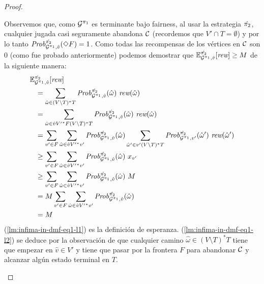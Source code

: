 \begin{proof}
\begin{proofofclaim}
    Observemos que, como $\mathcal{G}^{\pi_{1}}$ es terminante bajo fairness,
    al usar la estrategia $\hat{\pi_{2}}$, cualquier jugada casi seguramente abandona $\mathcal{C}$ (recordemos que $V' \cap T = \emptyset$) y por lo tanto
    $\mathit{Prob}^{\hat{\pi_{2}}}_{\mathcal{G}^{\pi_{1}},\hat{v}} (\Diamond F) = 1$.
    Como todas las recompensas de los vértices en $\mathcal{C}$ son $0$ (como fue probado anteriormente) podemos demostrar que
    $\mathbb{E}^{\hat{\pi_{2}}}_{\mathcal{G}^{\pi_{1}},\hat{v}}[\textit{rew}]
    \geq M$ de la siguiente manera:
    \begin{align}	
      \ExpectMDP{\hat{\strat{2}}}_{\StochG^{\strat{1}},\hat{v}}[\Rewards] \hspace{-4em} & \notag\\
      \label{lm:infima-in-dmf-eq1-l1}
      &= \sum_{\hat{\omega} \in (V \setminus T)^*T} \MDPProb{\hat{\strat{2}}}_{\StochG^{\strat{1}},\hat{v}}(\hat{\omega})\ \Rewards(\hat{\omega}) \\
      \label{lm:infima-in-dmf-eq1-l2}
      &=\sum_{\hat{\omega} \in \hat{v}{V'}^*F(V \setminus T)^*T} \MDPProb{\hat{\strat{2}}}_{\StochG^{\strat{1}},\hat{v}}(\hat{\omega})\ \Rewards(\hat{\omega}) \\
      \label{lm:infima-in-dmf-l3}
      &= \sum_{v' \in F} \sum_{\hat{\omega} \in \hat{v}{V'}^*v'} \MDPProb{\hat{\strat{2}}}_{\StochG^{\strat{1}},\hat{v}}(\hat{\omega}) \sum_{\hat{\omega}' \in v' (V \setminus T)^*T}  \MDPProb{\hat{\strat{2}}}_{\StochG^{\strat{1}},v'}(\hat{\omega}')\ \Rewards(\hat{\omega}')\\
      \label{lm:infima-in-dmf-l4}
      &\geq \sum_{v' \in F} \sum_{\hat{\omega} \in \hat{v}{V'}^*v'} \MDPProb{\hat{\strat{2}}}_{\StochG^{\strat{1}},\hat{v}}(\hat{\omega})\ x_{v'} \\
      \label{lm:infima-in-dmf-l5}
      &\geq \sum_{v' \in F} \sum_{\hat{\omega} \in \hat{v}{V'}^*v'} \MDPProb{\hat{\strat{2}}}_{\StochG^{\strat{1}},\hat{v}}(\hat{\omega})\ M \\
      \label{lm:infima-in-dmf-l6}
      &= M  \sum_{v' \in F} \sum_{\hat{\omega} \in \hat{v}{V'}^*v'} \MDPProb{\hat{\strat{2}}}_{\StochG^{\strat{1}},\hat{v}}(\hat{\omega}) \\
      \label{lm:infima-in-dmf-l7}
      &= M
    \end{align}
    (\ref{lm:infima-in-dmf-eq1-l1}) es la definición de esperanza.
    (\ref{lm:infima-in-dmf-eq1-l2}) se deduce por la observación de que cualquier camino $\hat{\omega} \in (V \setminus T)^*T$ tiene que empezar en
    $\hat{v}\in V'$ y tiene que pasar por la frontera $F$ para abandonar $\mathcal{C}$ y alcanzar algún estado terminal en $T$.

\end{proofofclaim}
\end{proof}
